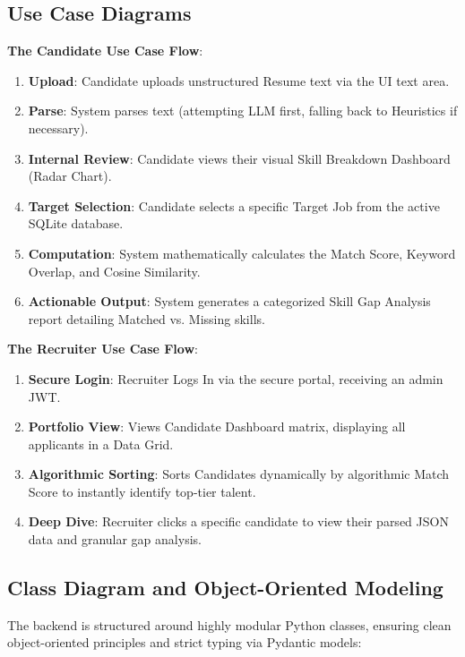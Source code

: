\documentclass[12pt,a4paper]{report}
\begin{document}
\subsection{Use Case Diagrams}
\textbf{The Candidate Use Case Flow}:
\begin{enumerate}
    \item \textbf{Upload}: Candidate uploads unstructured Resume text via the UI text area.
    \item \textbf{Parse}: System parses text (attempting LLM first, falling back to Heuristics if necessary).
    \item \textbf{Internal Review}: Candidate views their visual Skill Breakdown Dashboard (Radar Chart).
    \item \textbf{Target Selection}: Candidate selects a specific Target Job from the active SQLite database.
    \item \textbf{Computation}: System mathematically calculates the Match Score, Keyword Overlap, and Cosine Similarity.
    \item \textbf{Actionable Output}: System generates a categorized Skill Gap Analysis report detailing Matched vs. Missing skills.
\end{enumerate}

\textbf{The Recruiter Use Case Flow}:
\begin{enumerate}
    \item \textbf{Secure Login}: Recruiter Logs In via the secure portal, receiving an admin JWT.
    \item \textbf{Portfolio View}: Views Candidate Dashboard matrix, displaying all applicants in a Data Grid.
    \item \textbf{Algorithmic Sorting}: Sorts Candidates dynamically by algorithmic Match Score to instantly identify top-tier talent.
    \item \textbf{Deep Dive}: Recruiter clicks a specific candidate to view their parsed JSON data and granular gap analysis.
\end{enumerate}

\subsection{Class Diagram and Object-Oriented Modeling}
The backend is structured around highly modular Python classes, ensuring clean object-oriented principles and strict typing via Pydantic models:
\end{document}
